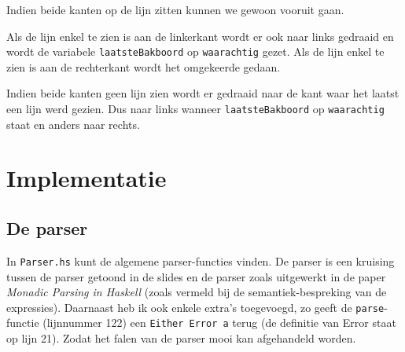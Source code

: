 \documentclass[11pt]{article}
\begin{document}
Indien beide kanten op de lijn zitten kunnen we gewoon vooruit gaan.

Als de lijn enkel te zien is aan de linkerkant wordt er ook naar links gedraaid en wordt de variabele \texttt{laatsteBakboord} op \texttt{waarachtig} gezet. Als de lijn enkel te zien is aan de rechterkant wordt het omgekeerde gedaan.

Indien beide kanten geen lijn zien wordt er gedraaid naar de kant waar het laatst een lijn werd gezien. Dus naar links wanneer \texttt{laatsteBakboord} op \texttt{waarachtig} staat en anders naar rechts.

\section{Implementatie}

\subsection{De parser}
In {\tt Parser.hs} kunt de algemene parser-functies vinden. De parser is een kruising tussen de parser getoond in de slides en de parser zoals uitgewerkt in de paper \textit{Monadic Parsing in Haskell} (zoals vermeld bij de semantiek-bespreking van de expressies). Daarnaast heb ik ook enkele extra's toegevoegd, zo geeft de \texttt{parse}-functie (lijnnummer 122) een \texttt{Either Error a} terug (de definitie van Error staat op lijn 21). Zodat het falen van de parser mooi kan afgehandeld worden.
\end{document}
